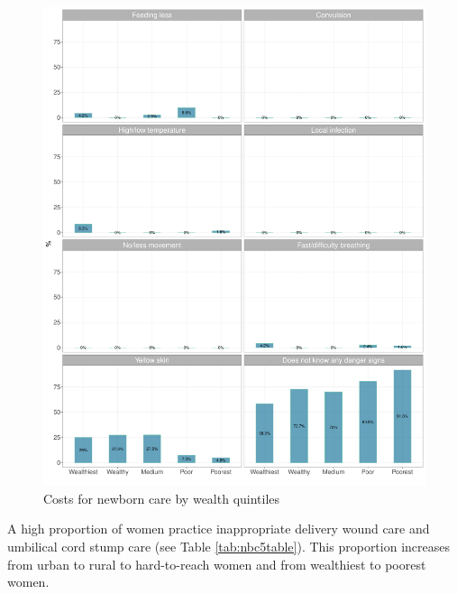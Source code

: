 \documentclass[12pt,a4paper]{article}
\begin{document}
\begin{figure}[H]

{\centering \includegraphics{kayinReport_files/figure-latex/nbc8Plot-1} 

}

\caption{Costs for newborn care by wealth quintiles}\label{fig:nbc8Plot}
\end{figure}

\newpage

A high proportion of women practice inappropriate delivery wound care and umbilical cord stump care (see Table \ref{tab:nbc5table}). This proportion increases from urban to rural to hard-to-reach women and from wealthiest to poorest women.
\end{document}
